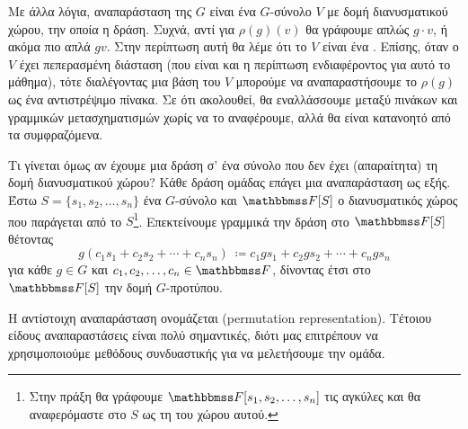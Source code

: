 \documentclass[12pt,a4paper,reqno]{amsart}
\newcommand{\defn}[1]{{\color{mylightblue}{#1}}}
\begin{document}
Με άλλα λόγια, αναπαράσταση της $G$ είναι ένα $G$-σύνολο $V$ με δομή διανυσματικού χώρου, την οποία  η δράση. Συχνά, αντί για $\rho(g)(v)$ θα γράφουμε απλώς $g \cdot v$, ή ακόμα πιο απλά $gv$. Στην περίπτωση αυτή θα λέμε ότι το $V$ είναι ένα \defn{$G$-πρότυπο}. Επίσης, όταν ο $V$ έχει πεπερασμένη διάσταση (που είναι και η περίπτωση ενδιαφέροντος για αυτό το μάθημα), τότε διαλέγοντας μια βάση του $V$ μπορούμε να αναπαραστήσουμε το $\rho(g)$ ως ένα αντιστρέψιμο πίνακα. Σε ότι ακολουθεί, θα εναλλάσσουμε μεταξύ πινάκων και γραμμικών μετασχηματισμών χωρίς να το αναφέρουμε, αλλά θα είναι κατανοητό από τα συμφραζόμενα.

Τι γίνεται όμως αν έχουμε μια δράση σ' ένα σύνολο που δεν έχει (απαραίτητα) τη δομή διανυσματικού χώρου? Κάθε δράση ομάδας επάγει μια αναπαράσταση ως εξής. Έστω $S = \{s_1, s_2, \dots, s_n\}$ ένα $G$-σύνολο και $\FF[S]$ ο διανυσματικός χώρος που παράγεται από το $S$\footnote{Στην πράξη θα γράφουμε $\FF[s_1, s_2, \dots, s_n]$  τις αγκύλες και θα αναφερόμαστε στο $S$ ως  τη \defn{συνήθη βάση} του χώρου αυτού.}. Επεκτείνουμε γραμμικά την δράση στο $\FF[S]$ θέτοντας 
\[
g\left(c_1s_1 + c_2s_2 + \cdots + c_ns_n\right) \ \coloneqq
c_1 gs_1 + c_2 gs_2 + \cdots + c_n gs_n
\] 
για κάθε $g \in G$ και $c_1, c_2, \dots, c_n \in \FF$, δίνοντας έτσι στο $\FF[S]$ την δομή $G$-προτύπου.

Η αντίστοιχη αναπαράσταση ονομάζεται \defn{αναπαράσταση μεταθέσεων} (permutation representation). Τέτοιου είδους αναπαραστάσεις είναι πολύ σημαντικές, διότι μας επιτρέπουν να χρησιμοποιούμε μεθόδους συνδυαστικής για να μελετήσουμε την ομάδα.
\end{document}
